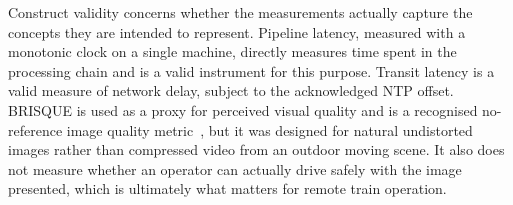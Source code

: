 Construct validity concerns whether the measurements actually capture the concepts they are intended to represent. Pipeline latency, measured with a monotonic clock on a single machine, directly measures time spent in the processing chain and is a valid instrument for this purpose. Transit latency is a valid measure of network delay, subject to the acknowledged NTP offset. BRISQUE is used as a proxy for perceived visual quality and is a recognised no-reference image quality metric~\cite{mittal2012}, but it was designed for natural undistorted images rather than compressed video from an outdoor moving scene. It also does not measure whether an operator can actually drive safely with the image presented, which is ultimately what matters for remote train operation.

